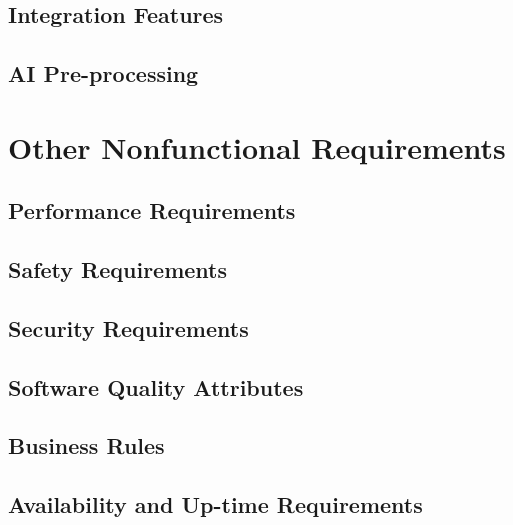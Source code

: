         \section{Integration Features}
            
        \section{AI Pre-processing}  
            


    \chapter{Other Nonfunctional Requirements}\label{ch:Other Nonfunctional Requirements}
        \section{Performance Requirements}
            
        \section{Safety Requirements}
            
        \section{Security Requirements}
            
        \section{Software Quality Attributes}
            
        \section{Business Rules}
            
        \section{Availability and Up-time Requirements}
            
